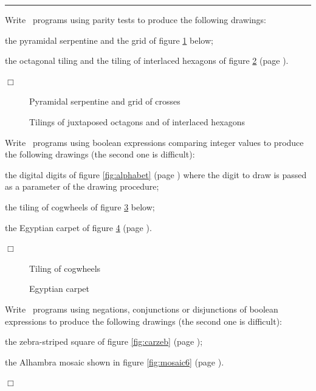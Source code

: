 \noindent \rule{137mm}{0.1mm}\par\nopagebreak %
\begin{exercices}{Write \python\ programs using parity tests to produce
the following drawings:

\tiret  the pyramidal serpentine and the grid of figure \ref{fig:serpyrgricr} below;

\tiret   the octagonal tiling and the tiling of interlaced hexagons of figure \ref{fig:pavocthex} (page \pageref{fig:pavocthex}).

\noindent $\Box$}\end{exercices}
\begin{figure}[htbp]
 \caption{Pyramidal serpentine and grid of crosses}\label{fig:serpyrgricr}
\end{figure}
\begin{figure}[htbp]
 \caption{Tilings of juxtaposed octagons and of interlaced hexagons}\label{fig:pavocthex}
\end{figure}
\begin{exercices}{Write \python\ programs using boo\-le\-an expressions comparing
integer values to produce the following drawings (the second one is difficult):

\tiret  the digital digits of figure \ref{fig:alphabet} (page \pageref{fig:alphabet}) where the digit to draw
is passed as a parameter of the drawing procedure;

\tiret  the tiling of cogwheels of figure \ref{fig:pavrd} below;

\tiret  the Egyptian carpet of figure \ref{fig:tapegyp} (page \pageref{fig:tapegyp}).

\noindent $\Box$}\end{exercices}
\begin{figure}[htbp]
 \caption{Tiling of cogwheels}\label{fig:pavrd}
\end{figure}
\begin{figure}[htbp]
 \caption{Egyptian carpet\label{fig:tapegyp}}
\end{figure}
\begin{exercices}{Write \python\ programs using negations, conjunctions or disjunctions of boolean
expressions to produce the following drawings (the second one is difficult):

\tiret  the zebra-striped square of figure \ref{fig:carzeb} (page \pageref{fig:carzeb});

\tiret  the Alhambra mosaic shown in figure \ref{fig:mosaic6} (page \pageref{fig:mosaic6}).

\noindent $\Box$}\end{exercices}
